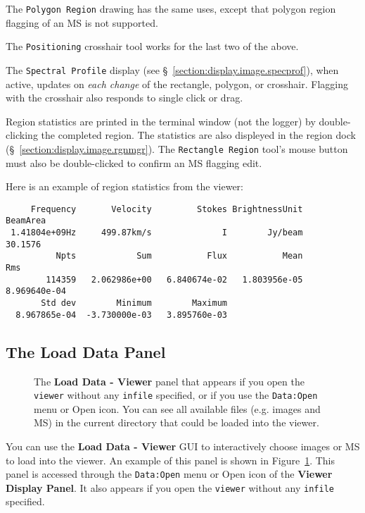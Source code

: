 The {\tt Polygon Region} drawing has the same uses, except that polygon region
flagging of an MS is not supported.

The {\tt Positioning} crosshair tool works for the last two of the above.

The {\tt Spectral Profile} display
(see \S~\ref{section:display.image.specprof}), when active, updates on
{\em each change} of the rectangle, polygon, or crosshair.  
Flagging with the crosshair also responds to single click or drag.

Region statistics are printed in the terminal window (not the logger)
by double-clicking the completed region. The statistics are also
displeyed in the region dock
(\S~\ref{section:display.image.rgnmgr}). The {\tt Rectangle Region}
tool's mouse button must also be double-clicked to confirm an MS
flagging edit.

Here is an example of region statistics from the viewer:
\small
\begin{verbatim}
     Frequency       Velocity         Stokes BrightnessUnit       BeamArea 
 1.41804e+09Hz     499.87km/s              I        Jy/beam        30.1576 
          Npts            Sum           Flux           Mean            Rms 
        114359   2.062986e+00   6.840674e-02   1.803956e-05   8.969640e-04 
       Std dev        Minimum        Maximum 
  8.967865e-04  -3.730000e-03   3.895760e-03 
\end{verbatim}
\normalsize


\subsection{The Load Data Panel}
\label{section:display.viewerGUI.load}
\begin{figure}[h!]
\begin{center}
\caption{\label{fig:viewer_load} The {\bf Load Data - Viewer} panel
that appears if you open the {\tt viewer} without any {\tt infile}
specified, or if you use the {\tt Data:Open} menu or Open icon.
You can see all available files (e.g. images and MS) in the current directory
that could be loaded into the viewer.} 
\hrulefill
\end{center}
\end{figure}

You can use the {\bf Load Data - Viewer} GUI to interactively
choose images or MS to load into the viewer.  An example of
this panel is shown in Figure~\ref{fig:viewer_load}.  This
panel is accessed through the {\tt Data:Open} menu or Open icon
of the {\bf Viewer Display Panel}.  It also appears if you open 
the {\tt viewer} without any {\tt infile} specified.

